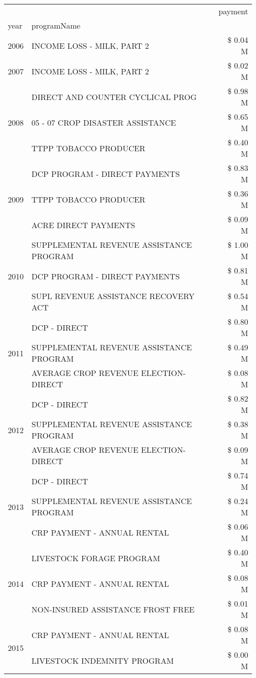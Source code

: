 \begin{tabular}{llr}
\toprule
 &  & payment \\
year & programName &  \\
\midrule
2006 & INCOME LOSS - MILK, PART 2 & \$ 0.04 M \\
\cline{1-3}
2007 & INCOME LOSS - MILK, PART 2 & \$ 0.02 M \\
\cline{1-3}
\multirow[t]{3}{*}{2008} & DIRECT AND COUNTER CYCLICAL PROG & \$ 0.98 M \\
 & 05 - 07 CROP DISASTER ASSISTANCE & \$ 0.65 M \\
 & TTPP TOBACCO PRODUCER & \$ 0.40 M \\
\cline{1-3}
\multirow[t]{3}{*}{2009} & DCP PROGRAM - DIRECT PAYMENTS & \$ 0.83 M \\
 & TTPP TOBACCO PRODUCER & \$ 0.36 M \\
 & ACRE DIRECT PAYMENTS & \$ 0.09 M \\
\cline{1-3}
\multirow[t]{3}{*}{2010} & SUPPLEMENTAL REVENUE ASSISTANCE PROGRAM & \$ 1.00 M \\
 & DCP PROGRAM - DIRECT PAYMENTS & \$ 0.81 M \\
 & SUPL REVENUE ASSISTANCE RECOVERY ACT & \$ 0.54 M \\
\cline{1-3}
\multirow[t]{3}{*}{2011} & DCP - DIRECT & \$ 0.80 M \\
 & SUPPLEMENTAL REVENUE ASSISTANCE PROGRAM & \$ 0.49 M \\
 & AVERAGE CROP REVENUE ELECTION-DIRECT & \$ 0.08 M \\
\cline{1-3}
\multirow[t]{3}{*}{2012} & DCP - DIRECT & \$ 0.82 M \\
 & SUPPLEMENTAL REVENUE ASSISTANCE PROGRAM & \$ 0.38 M \\
 & AVERAGE CROP REVENUE ELECTION-DIRECT & \$ 0.09 M \\
\cline{1-3}
\multirow[t]{3}{*}{2013} & DCP - DIRECT & \$ 0.74 M \\
 & SUPPLEMENTAL REVENUE ASSISTANCE PROGRAM & \$ 0.24 M \\
 & CRP PAYMENT - ANNUAL RENTAL & \$ 0.06 M \\
\cline{1-3}
\multirow[t]{3}{*}{2014} & LIVESTOCK FORAGE PROGRAM & \$ 0.40 M \\
 & CRP PAYMENT - ANNUAL RENTAL & \$ 0.08 M \\
 & NON-INSURED ASSISTANCE FROST FREE & \$ 0.01 M \\
\cline{1-3}
\multirow[t]{3}{*}{2015} & CRP PAYMENT - ANNUAL RENTAL & \$ 0.08 M \\
 & LIVESTOCK INDEMNITY PROGRAM & \$ 0.00 M \\

\end{tabular}
